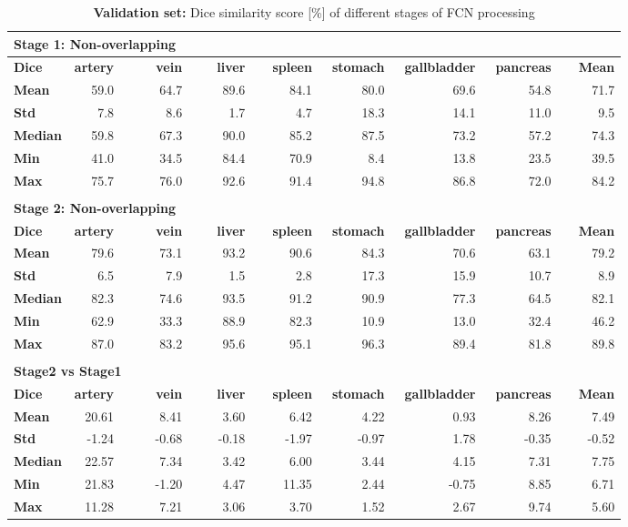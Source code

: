 \documentclass[authoryear]{elsarticle}
\begin{document}
\begin{table}
\tiny
	\centering
	\caption{\textbf{Validation set:} Dice similarity score [\%] of different stages of FCN processing}
	\label{tab:dice_results_validation}
	\begin{tabular}{lrrrrrrrr}
		\multicolumn{8}{l}{\textbf{Stage 1: Non-overlapping}} \tabularnewline
		\hline
		\rowcolor[gray]{.9}\textbf{Dice} & \textbf{artery} & \textbf{\ \ \ \ vein} & \textbf{\ \ \ liver} & \textbf{\ \ spleen} & \textbf{\ stomach} & \textbf{\ gallbladder} & \textbf{\ pancreas} & \textbf{ \ \ Mean}\tabularnewline
		\hline
		\textbf{Mean} & 59.0 & 64.7 & 89.6 & 84.1 & 80.0 & 69.6 & 54.8 & 71.7\tabularnewline
		\rowcolor[gray]{.9}\textbf{Std} & 7.8 & 8.6 & 1.7 & 4.7 & 18.3 & 14.1 & 11.0 & 9.5\tabularnewline
		\textbf{Median} & 59.8 & 67.3 & 90.0 & 85.2 & 87.5 & 73.2 & 57.2 & 74.3\tabularnewline
		\rowcolor[gray]{.9}\textbf{Min} & 41.0 & 34.5 & 84.4 & 70.9 & 8.4 & 13.8 & 23.5 & 39.5\tabularnewline
		\textbf{Max} & 75.7 & 76.0 & 92.6 & 91.4 & 94.8 & 86.8 & 72.0 & 84.2\tabularnewline
		\hline
		&  &  &  &  &  &  &  \tabularnewline
		\multicolumn{8}{l}{\textbf{Stage 2: Non-overlapping}} \tabularnewline
		\hline
		\rowcolor[gray]{.9}\textbf{Dice} & \textbf{artery} & \textbf{vein} & \textbf{liver} & \textbf{spleen} & \textbf{stomach} & \textbf{gallbladder} & \textbf{pancreas} & \textbf{Mean}\tabularnewline
		\hline
		\textbf{Mean} & 79.6 & 73.1 & 93.2 & 90.6 & 84.3 & 70.6 & 63.1 & 79.2\tabularnewline
		\rowcolor[gray]{.9}\textbf{Std} & 6.5 & 7.9 & 1.5 & 2.8 & 17.3 & 15.9 & 10.7 & 8.9\tabularnewline
		\textbf{Median} & 82.3 & 74.6 & 93.5 & 91.2 & 90.9 & 77.3 & 64.5 & 82.1\tabularnewline
		\rowcolor[gray]{.9}\textbf{Min} & 62.9 & 33.3 & 88.9 & 82.3 & 10.9 & 13.0 & 32.4 & 46.2\tabularnewline
		\textbf{Max} & 87.0 & 83.2 & 95.6 & 95.1 & 96.3 & 89.4 & 81.8 & 89.8\tabularnewline
		\hline
		&  &  &  &  &  &  &  \tabularnewline
		\multicolumn{8}{l}{\textbf{Stage2 vs Stage1}} \tabularnewline
		\hline
		\rowcolor[gray]{.9}\textbf{Dice} & \textbf{artery} & \textbf{vein} & \textbf{liver} & \textbf{spleen} & \textbf{stomach} & \textbf{gallbladder} & \textbf{pancreas} & \textbf{Mean}
		\tabularnewline
		\hline
		\textbf{Mean} & 20.61 & 8.41 & 3.60 & 6.42 & 4.22 & 0.93 & 8.26 & 7.49\tabularnewline
		\rowcolor[gray]{.9}\textbf{Std} & -1.24 & -0.68 & -0.18 & -1.97 & -0.97 & 1.78 & -0.35 & -0.52\tabularnewline
		\textbf{Median} & 22.57 & 7.34 & 3.42 & 6.00 & 3.44 & 4.15 & 7.31 & 7.75\tabularnewline
		\rowcolor[gray]{.9}\textbf{Min} & 21.83 & -1.20 & 4.47 & 11.35 & 2.44 & -0.75 & 8.85 & 6.71\tabularnewline
		\textbf{Max} & 11.28 & 7.21 & 3.06 & 3.70 & 1.52 & 2.67 & 9.74 & 5.60\tabularnewline
	\end{tabular}
\end{table}
\end{document}
